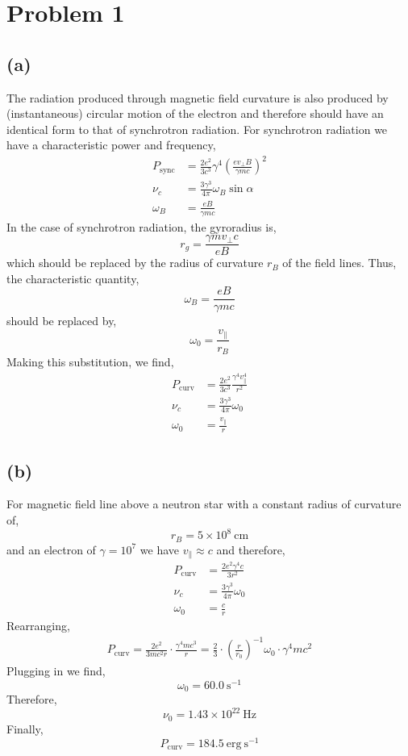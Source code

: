 \documentclass[12pt]{article}
\begin{document}

\section{Problem 1}

\subsection*{(a)}

The radiation produced through magnetic field curvature is also produced by (instantaneous) circular motion of the electron and therefore should have an identical form to that of synchrotron radiation. For synchrotron radiation we have a characteristic power and frequency,
\begin{align*}
P_{\text{sync}} & = \frac{2 e^2}{3 c^3} \gamma^4 \left( \frac{e v_\perp B}{\gamma m c} \right)^2 
\\
\nu_c & = \frac{3 \gamma^3}{4 \pi} \omega_B \sin{\alpha} 
\\
\omega_B & = \frac{e B}{\gamma m c}
\end{align*}
In the case of synchrotron radiation, the gyroradius is,
\[ r_g = \frac{\gamma m v_\perp c}{e B} \]
which should be replaced by the radius of curvature $r_B$ of the field lines. Thus, the characteristic quantity,
\[ \omega_B = \frac{e B}{\gamma m c} \]
should be replaced by,
\[ \omega_0 = \frac{v_{\parallel}}{r_B} \]
Making this substitution, we find,
\begin{align*}
P_{\text{curv}} & = \frac{2 e^2}{3 c^3} \frac{\gamma^4 v_{\parallel}^4}{r^2} 
\\
\nu_c & = \frac{3 \gamma^3}{4 \pi} \omega_0
\\
\omega_0 & = \frac{v_{\parallel}}{r}
\end{align*}

\subsection*{(b)}

For magnetic field line above a neutron star with a constant radius of curvature of,
\[ r_B = 5 \times 10^{8} \: \mathrm{cm} \]
and an electron  of $\gamma = 10^{7}$ we have $v_\parallel \approx c$ and therefore,
\begin{align*}
P_{\text{curv}} & = \frac{2 e^2 \gamma^4 c}{3 r^2}
\\
\nu_c & = \frac{3 \gamma^3}{4 \pi} \omega_0
\\
\omega_0 & = \frac{c}{r}
\end{align*}
Rearranging,
\begin{align*}
P_{\text{curv}} =  \frac{2 e^2}{3 m c^2 r} \cdot \frac{\gamma^4 m c^3}{r} = \frac{2}{3} \cdot \left( \frac{r}{r_0} \right)^{-1} \omega_0 \cdot \gamma^4 m c^2
\end{align*}
Plugging in we find,
\[ \omega_0 = 60.0 \: \mathrm{s}^{-1} \]
Therefore,
\[ \nu_0 = 1.43 \times 10^{22} \: \mathrm{Hz} \]
Finally,
\[ P_{\text{curv}} = 184.5 \: \mathrm{erg} \: \mathrm{s}^{-1} \]
\end{document}
